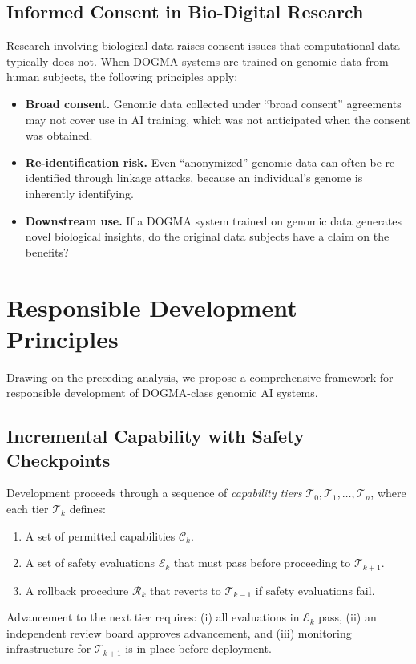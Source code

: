 \subsection{Informed Consent in Bio-Digital Research}

Research involving biological data raises consent issues that computational data typically does not.
When DOGMA systems are trained on genomic data from human subjects, the following principles apply:
\begin{itemize}[leftmargin=1.5em]
  \item \textbf{Broad consent.} Genomic data collected under ``broad consent'' agreements may not cover use in AI training, which was not anticipated when the consent was obtained.
  \item \textbf{Re-identification risk.} Even ``anonymized'' genomic data can often be re-identified through linkage attacks, because an individual's genome is inherently identifying.
  \item \textbf{Downstream use.} If a DOGMA system trained on genomic data generates novel biological insights, do the original data subjects have a claim on the benefits?
\end{itemize}

\section{Responsible Development Principles}
\label{sec:responsible-dev}

Drawing on the preceding analysis, we propose a comprehensive framework for responsible development of DOGMA-class genomic AI systems.

\subsection{Incremental Capability with Safety Checkpoints}

\begin{dogmadef}
Development proceeds through a sequence of \emph{capability tiers} $\mathcal{T}_0, \mathcal{T}_1, \ldots, \mathcal{T}_n$, where each tier $\mathcal{T}_k$ defines:
\begin{enumerate}[leftmargin=1.5em]
  \item A set of permitted capabilities $\mathcal{C}_k$.
  \item A set of safety evaluations $\mathcal{E}_k$ that must pass before proceeding to $\mathcal{T}_{k+1}$.
  \item A rollback procedure $\mathcal{R}_k$ that reverts to $\mathcal{T}_{k-1}$ if safety evaluations fail.
\end{enumerate}
Advancement to the next tier requires: (i) all evaluations in $\mathcal{E}_k$ pass, (ii) an independent review board approves advancement, and (iii) monitoring infrastructure for $\mathcal{T}_{k+1}$ is in place before deployment.
\end{dogmadef}

